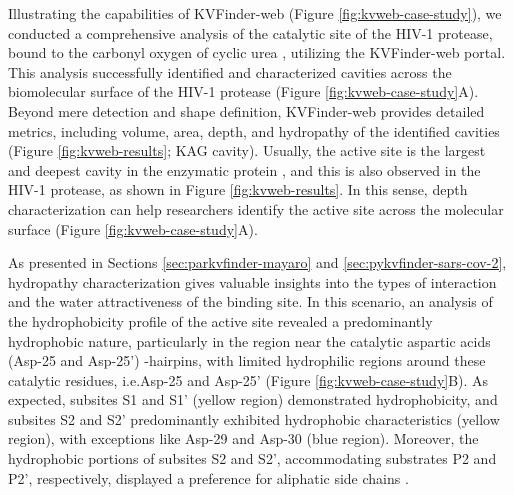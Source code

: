 \documentclass[Ingles]{phdthesis}
\def\ie{i.e.\onedot}
\begin{document}
Illustrating the capabilities of KVFinder-web (Figure \ref{fig:kvweb-case-study}), we conducted a comprehensive analysis of the catalytic site of the \acs{HIV-1} protease, bound to the carbonyl oxygen of cyclic urea \cite{lam1994}, utilizing the KVFinder-web portal. This analysis successfully identified and characterized cavities across the biomolecular surface of the \acs{HIV-1} protease (Figure \ref{fig:kvweb-case-study}A). Beyond mere detection and shape definition, KVFinder-web provides detailed metrics, including volume, area, depth, and hydropathy of the identified cavities (Figure \ref{fig:kvweb-results}; KAG cavity). Usually, the active site is the largest and deepest cavity in the enzymatic protein \cite{laskowski1996}, and this is also observed in the \acs{HIV-1} protease, as shown in Figure \ref{fig:kvweb-results}. In this sense, depth characterization can help researchers identify the active site across the molecular surface (Figure \ref{fig:kvweb-case-study}A).

As presented in Sections \ref{sec:parkvfinder-mayaro} and \ref{sec:pykvfinder-sars-cov-2}, hydropathy characterization gives valuable insights into the types of interaction and the water attractiveness of the binding site. In this scenario, an analysis of the hydrophobicity profile of the active site revealed a predominantly hydrophobic nature, particularly in the region near the catalytic aspartic acids (Asp-25 and Asp-25') \textbeta-hairpins, with limited hydrophilic regions around these catalytic residues, \ie Asp-25 and Asp-25' (Figure \ref{fig:kvweb-case-study}B). As expected, subsites S1 and S1' (yellow region) demonstrated hydrophobicity, and subsites S2 and S2' predominantly exhibited hydrophobic characteristics (yellow region), with exceptions like Asp-29 and Asp-30 (blue region). Moreover, the hydrophobic portions of subsites S2 and S2', accommodating substrates P2 and P2', respectively, displayed a preference for aliphatic side chains \cite{lam1994,brik2002,weber2009}.
\end{document}
